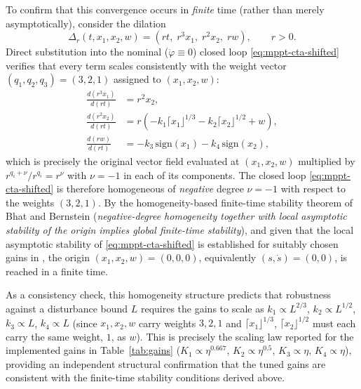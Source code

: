 \documentclass[preprint,12pt]{elsarticle}
\begin{document}
To confirm that this convergence occurs in \emph{finite} time (rather than merely asymptotically), consider the dilation
\begin{equation}
    \Delta_r(t,x_1,x_2,w) = (rt,\; r^3x_1,\; r^2x_2,\; rw), \qquad r>0.
    \label{eq:dilation}
\end{equation}
Direct substitution into the nominal ($\dot\varphi \equiv 0$) closed loop \eqref{eq:mppt-cta-shifted} verifies that every term scales consistently with the weight vector $(q_1,q_2,q_3)=(3,2,1)$ assigned to $(x_1,x_2,w)$:
\begin{equation}
\begin{aligned}
    \frac{d(r^3x_1)}{d(rt)} &= r^2 x_2, \\
    \frac{d(r^2x_2)}{d(rt)} &= r\left(-k_1\lceil x_1\rfloor^{1/3} - k_2\lceil x_2\rfloor^{1/2}+w\right), \\
    \frac{d(rw)}{d(rt)} &= -k_3\,\mathrm{sign}(x_1) - k_4\,\mathrm{sign}(x_2),
\end{aligned}
\label{eq:homogeneity-check}
\end{equation}
which is precisely the original vector field evaluated at $(x_1,x_2,w)$ multiplied by $r^{q_i+\nu}/r^{q_i}=r^\nu$ with $\nu = -1$ in each of its components. The closed loop \eqref{eq:mppt-cta-shifted} is therefore homogeneous of \emph{negative} degree $\nu=-1$ with respect to the weights $(3,2,1)$. By the homogeneity-based finite-time stability theorem of Bhat and Bernstein (\emph{negative-degree homogeneity together with local asymptotic stability of the origin implies global finite-time stability}), and given that the local asymptotic stability of \eqref{eq:mppt-cta-shifted} is established for suitably chosen gains in \cite[Thm. ~1]{torres2017design}, the origin $(x_1,x_2,w)=(0,0,0)$, equivalently $(s,\dot s)=(0,0)$, is reached in a finite time.

As a consistency check, this homogeneity structure predicts that robustness against a disturbance bound $L$ requires the gains to scale as $k_1 \propto L^{2/3}$, $k_2 \propto L^{1/2}$, $k_3 \propto L$, $k_4 \propto L$ (since $x_1,x_2,w$ carry weights $3,2,1$ and $\lceil x_1\rfloor^{1/3}$, $\lceil x_2\rfloor^{1/2}$ must each carry the same weight, $1$, as $w$). This is precisely the scaling law reported for the implemented gains in Table~\ref{tab:gains} ($K_1 \propto \eta^{0.667}$, $K_2 \propto \eta^{0.5}$, $K_3 \propto \eta$, $K_4 \propto \eta$), providing an independent structural confirmation that the tuned gains are consistent with the finite-time stability conditions derived above.
\end{document}
